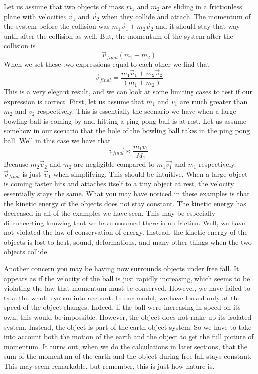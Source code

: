 Let us assume that two objects of mass $m_1$ and $m_2$ are sliding in a frictionless plane with velocities $\vec{v}_1$ and $\vec{v}_2$ when they collide and attach. The momentum of the system before the collision was $m_1\vec{v}_1+m_2\vec{v}_2$ and it should stay that way until after the collision as well. But, the momentum of the system after the collision is \begin{equation}\vec{v}_{final}\left(m_1+m_2 \right)\end{equation} When we set these two expressions equal to each other we find that \begin{equation}\vec{v}_{final}=\frac{m_1\vec{v}_1+m_2\vec{v}_2}{\left(m_1+m_2\right)}\end{equation} This is a very elegant result, and we can look at some limiting cases to test if our expression is correct. First, let us assume that $m_1$ and $v_1$ are much greater than $m_2$ and $v_2$ respectively. This is essentially the scenario we have when a large bowling ball is coming by and hitting a ping pong ball is at rest. Let us assume somehow in our scenario that the hole of the bowling ball takes in the ping pong ball. Well in this case we have that  $$\vec{v_{final}} \approx \frac{m_1 v_1}{M_1}$$ Because $m_2\vec{v}_2$ and $m_2$ are negligible compared to $m_1\vec{v_1}$ and $m_1$ respectively. $\vec{v}_{final}$ is just $\vec{v}_1$ when simplifying. This should be intuitive. When a large object is coming faster hits and attaches itself to a tiny object at rest, the velocity essentially stays the same. What you may have noticed in these examples is that the kinetic energy of the objects does not stay constant. The kinetic energy has decreased in all of the examples we have seen. This may be especially disconcerting knowing that we have assumed there is no friction. Well, we have not violated the law of conservation of energy. Instead, the kinetic energy of the objects is lost to heat, sound, deformations, and many other things when the two objects collide. 

Another concern you may be having now surrounds objects under free fall. It appears as if the velocity of the ball is just rapidly increasing, which seems to be violating the law that momentum must be conserved. However, we have failed to take the whole system into account. In our model, we have looked only at the speed of the object changes. Indeed, if the ball were increasing in speed on its own, this would be impossible. However, the object does not make up its isolated system. Instead, the object is part of the earth-object system. So we have to take into account both the motion of the earth and the object to get the full picture of momentum. It turns out, when we do the calculations in later sections, that the sum of the momentum of the earth and the object during free fall stays constant. This may seem remarkable, but remember, this is just how nature is. 

